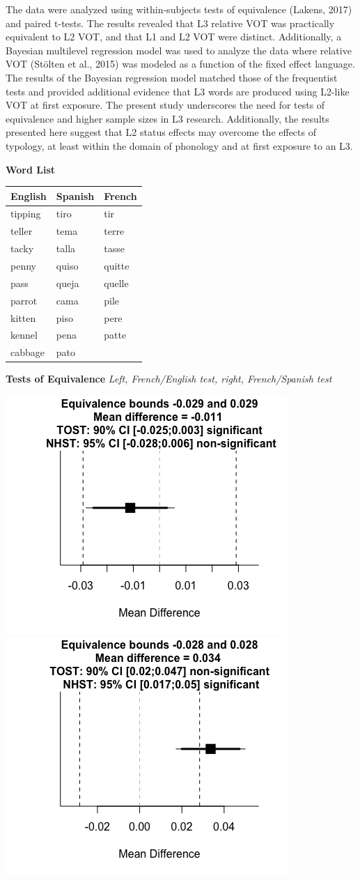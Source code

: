 \documentclass[
  12pt,
]{article}
\begin{document}
The data were analyzed using within-subjects tests of equivalence
(Lakens, 2017) and paired t-tests. The results revealed that L3 relative
VOT was practically equivalent to L2 VOT, and that L1 and L2 VOT were
distinct. Additionally, a Bayesian multilevel regression model was used
to analyze the data where relative VOT (Stölten et al., 2015) was
modeled as a function of the fixed effect language. The results of the
Bayesian regression model matched those of the frequentist tests and
provided additional evidence that L3 words are produced using L2-like
VOT at first exposure. The present study underscores the need for tests
of equivalence and higher sample sizes in L3 research. Additionally, the
results presented here suggest that L2 status effects may overcome the
effects of typology, at least within the domain of phonology and at
first exposure to an L3.

\newpage

\textbf{Word List}

\begin{longtable}[]{@{}lll@{}}
\toprule
English & Spanish & French \\
\midrule
\endhead
tipping & tiro & tir \\
teller & tema & terre \\
tacky & talla & tasse \\
penny & quiso & quitte \\
pass & queja & quelle \\
parrot & cama & pile \\
kitten & piso & pere \\
kennel & pena & patte \\
cabbage & pato & \\
\bottomrule
\end{longtable}

\textbf{Tests of Equivalence} \emph{Left, French/English test, right,
French/Spanish test}

\includegraphics[width=0.5\linewidth]{plots/french_eng_tost}
\includegraphics[width=0.5\linewidth]{plots/french_span_tost}
\end{document}

